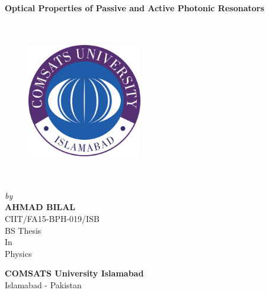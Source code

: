 \documentclass[12pt,twoside]{report}
\begin{document}
	\begin{center}
		
		\Large \textbf{Optical Properties of Passive and Active Photonic Resonators}
		
	\end{center}
\begin{center}
	\begin{figure}[h]
	\centering
	\includegraphics[width=5cm,height=7cm,keepaspectratio]{universitye.jpg}\\
	\end{figure}
\end{center}
	\begin{center}
		\emph{\large by}\\
		
		\Large \textbf{AHMAD BILAL}\\
		\Large CIIT/FA15-BPH-019/ISB\\
		\vfill
		\Large BS Thesis\\
		\Large In\\
		\Large Physics
	\end{center}
	\vfill
	\begin{center}
		\Large \textbf{COMSATS University Islamabad}\\
		\Large Islamabad - Pakistan
	\end{center}
	
\end{document}
